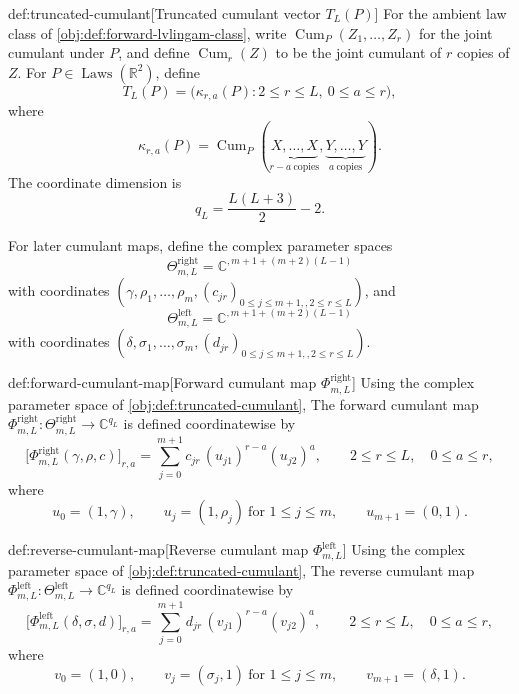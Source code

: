 \begin{definitionv}{def:truncated-cumulant}[Truncated cumulant vector \(T_L(P)\)]
For the ambient law class of \cref{obj:def:forward-lvlingam-class}, write \(\operatorname{Cum}_P(Z_1,\ldots,Z_r)\) for the joint cumulant under \(P\), and define \(\operatorname{Cum}_r(Z)\) to be the joint cumulant of \(r\) copies of \(Z\). For \(P\in \operatorname{Laws}(\mathbb R^2)\), define
\[
T_L(P)=\bigl(\kappa_{r,a}(P):2\le r\le L,\ 0\le a\le r\bigr),
\]
where
\[
\kappa_{r,a}(P)
=
\operatorname{Cum}_P(\underbrace{X,\ldots,X}_{r-a\ \mathrm{copies}},
\underbrace{Y,\ldots,Y}_{a\ \mathrm{copies}}).
\]
The coordinate dimension is
\[
q_L=\frac{L(L+3)}{2}-2.
\]

For later cumulant maps, define the complex parameter spaces
\[
\Theta^{\mathrm{right}}_{m,L}
=\mathbb C^{,m+1+(m+2)(L-1)}
\]
with coordinates \((\gamma,\rho_1,\ldots,\rho_m,(c_{jr})_{0\le j\le m+1,,2\le r\le L})\), and
\[
\Theta^{\mathrm{left}}_{m,L}
=\mathbb C^{,m+1+(m+2)(L-1)}
\]
with coordinates \((\delta,\sigma_1,\ldots,\sigma_m,(d_{jr})_{0\le j\le m+1,,2\le r\le L})\).
\end{definitionv}

\begin{definitionv}{def:forward-cumulant-map}[Forward cumulant map \(\Phi^{\mathrm{right}}_{m,L}\)]
Using the complex parameter space of \cref{obj:def:truncated-cumulant}, The forward cumulant map \(\Phi^{\mathrm{right}}_{m,L}:\Theta^{\mathrm{right}}_{m,L}\to\mathbb C^{q_L}\) is defined coordinatewise by
\[
\bigl[\Phi^{\mathrm{right}}_{m,L}(\gamma,\rho,c)\bigr]_{r,a}
=
\sum_{j=0}^{m+1}
c_{jr}\,(u_{j1})^{r-a}(u_{j2})^a,
\qquad
2\le r\le L,\quad 0\le a\le r,
\]
where
\[
u_0=(1,\gamma),\qquad
u_j=(1,\rho_j)\ \text{for }1\le j\le m,\qquad
u_{m+1}=(0,1).
\]
\end{definitionv}

\begin{definitionv}{def:reverse-cumulant-map}[Reverse cumulant map \(\Phi^{\mathrm{left}}_{m,L}\)]
Using the complex parameter space of \cref{obj:def:truncated-cumulant}, The reverse cumulant map \(\Phi^{\mathrm{left}}_{m,L}:\Theta^{\mathrm{left}}_{m,L}\to\mathbb C^{q_L}\) is defined coordinatewise by
\[
\bigl[\Phi^{\mathrm{left}}_{m,L}(\delta,\sigma,d)\bigr]_{r,a}
=
\sum_{j=0}^{m+1}
d_{jr}\,(v_{j1})^{r-a}(v_{j2})^a,
\qquad
2\le r\le L,\quad 0\le a\le r,
\]
where
\[
v_0=(1,0),\qquad
v_j=(\sigma_j,1)\ \text{for }1\le j\le m,\qquad
v_{m+1}=(\delta,1).
\]
\end{definitionv}

